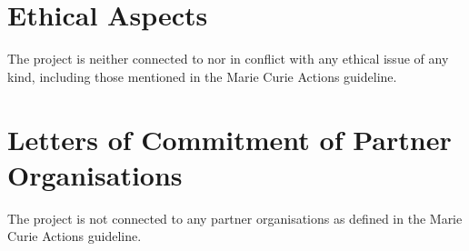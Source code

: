 \documentclass[a4paper,11pt]{article}
\begin{document}
\section{Ethical Aspects}
The project is neither connected to nor in conflict with any ethical issue of any kind, including
those mentioned in the Marie Curie Actions guideline.

\section{Letters of Commitment of Partner Organisations}
\label{sec:letters}
The project is not connected to any partner organisations as defined in the Marie Curie Actions guideline.


\clearpage

\MSCAendpage
\end{document}
